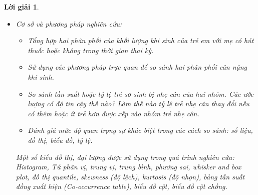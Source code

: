 \documentclass[14pt, a4paper]{article}
\theoremstyle{sltheorem}
\theoremstyle{soltheorem}
\newtheorem*{loigiai}{Lời giải}
\begin{document}
\begin{loigiai}
\begin{itemize}
        \begin{itemize}
            \item Những phụ nữ tham gia chương trình chăm sóc y tế tại Kaiser tương đối sớm trong thai kỳ.
            Hai phần ba trong báo cáo là vào 3 tháng đầu tiên, gần một phần hai khi đang mang thai 2 tháng hoặc ít hơn. 
            Các gia đình tham gia nghiên cứu nằm trong đa dạng các đặc điểm kinh tế, xã hội và giao dục. 
            Gần hai phần ba là người da trắng, một phần năm là người da màu, 3 đến 4 \% là người phương Đông, và còn lại các các chủng tộc khác và các hôn nhân hỗn hợp màu da. Khoảng 30 \% các ông chồng làm nghề chuyên nghiệp. 
            Một lượng lớn là các thành viên của các hiệp hội khác nhau. Gần 10 \% đang làm việc tại Đại học California Berkeley trong các vị trí học thuật hoặc hành chính, và 20 phần trăm là trong cơ quan chính phủ. 
            Trình độ học vấn cao hơn chút so với mặt bằng chung bang California cũng như thu nhập trung bình. 
            Vì vậy đối tương nghiên cứu nói chung không phải là điển hình của dân số có việc làm. Những người tham gia thiếu phân khúc rất nghèo hoặc rất giàu vì những những nhóm này không có khả năng đại diện trong một chương trình y tế trả trước.
            \item Khi sinh ra, các phép đo sẽ được thực hiện trên các em bé. 
            Bao gồm chiều dài, cân nặng và chu vi vòng đầu của em bé. 
            Được cung cấp ở đây là một tập con của thông tin thu thập từ 1236 em bé - những bé trai được sinh ra trong một năm của nghiên cứu đã sống ít nhất 28 ngày và là trẻ được sinh một (tức là không phải là một trong các cặp song sinh hoặc sinh ba). 
            Thông tin có cho mỗi em bé là cân nặng khi sinh và người mẹ có hút thuốc khi mang thai hay không.
        \end{itemize}
        \item Cơ sở và phương pháp nghiên cứu:
        \begin{itemize}
            \item Tổng hợp hai phân phối của khối lượng khi sinh của trẻ em với mẹ có hút thuốc hoặc không trong thời gian thai kỳ.
            \item Sử dụng các phương pháp trực quan để so sánh hai phân phối cân nặng khi sinh.
            \item So sánh tần suất hoặc tỷ lệ trẻ sơ sinh bị nhẹ cân của hai nhóm. Các ước lượng có độ tin cậy thế nào? Làm thế nào tỷ lệ trẻ nhẹ cân thay đổi nếu có thêm hoặc ít trẻ hơn được xếp vào nhóm trẻ nhẹ cân.
            \item Đánh giá mức độ quan trọng sự khác biệt trong các cách so sánh: số liệu, đồ thị, biểu đồ, tỷ lệ.
        \end{itemize}

        Một số kiểu đồ thị, đại lượng được sử dụng trong quá trình nghiên cứu: Histogram, Tứ phân vị, trung vị, trung bình, phương sai, whisker and box plot, đồ thị quantile,
        skewness (độ lệch), kurtosis (độ nhọn), bảng tần suất đồng xuất hiện (Co-occurrence table), biểu đồ cột, biểu đồ cột chồng.
    \end{itemize}
\end{loigiai}
\end{document}
